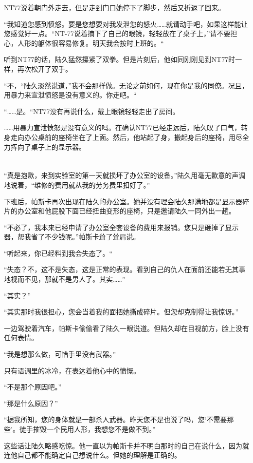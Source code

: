 NT77说着朝门外走去，但是走到门口她停下了脚步，然后又折返了回来。

“我知道您感到愤怒。要是您想要对我发泄您的怒火……就请动手吧，如果这样能让您感觉好一点。“NT-77说着摘下了自己的眼镜，轻轻放在了桌子上，”请不要担心，人形的躯体很容易修复。明天我会按时上班的。“

听到NT77的话，陆久猛然攥紧了双拳。但是片刻后，他如同刚刚见到NT77时一样，再次松开了双手。

“不，“陆久淡然说道，”我不会那样做。无论之前如何，现在你是我的同僚。况且，用暴力来宣泄愤怒是没有意义的。你走吧。“

“……是。“NT77没有再说什么，戴上眼镜轻轻走出了房间。

……用暴力宣泄愤怒是没有意义的吗。在确认NT77已经走远后，陆久叹了口气，转身走向办公桌前的座椅坐在了上面。然后，他站起了身，搬起身后的座椅，用尽全力挥向了桌子上的显示器。

\section*{}

“真是抱歉，来到实验室的第一天就损坏了办公室的设备。”陆久用毫无歉意的声调地说着，“维修的费用就从我的劳务费里扣好了。”

下班后，帕斯卡再次出现在陆久的办公室。她并没有理会陆久那满地都是显示器碎片的办公室和他屁股下面已经扭曲变形的座椅，只是邀请陆久一同外出一趟。

“不必了，我本来已经申请了办公室全套设备的费用来报销。您只是砸掉了显示器，帮我省了不少钱呢。”帕斯卡耸了耸肩说。

“听起来，你已经料到我会失态了。“

“失态？不，这不是失态，这是正常的表现。看到自己的仇人在面前还能若无其事地视而不见，那就不是男人了。其实……”

“其实？”

“其实那时我很担心，您会当着我的面把她撕成碎片。但您却克制得让我惊讶。”

一边驾驶着汽车，帕斯卡偷偷看了陆久一眼说道。但陆久却在目视前方，脸上没有任何表情。

“我是想那么做，可惜手里没有武器。” 

只有语调里的冰冷，在表达着他心中的愤慨。

“不是那个原因吧。”

“那是什么原因？”

“据我所知，您的身体就是一部杀人武器。昨天您不是也说了吗，您‘不需要那些’。徒手摧毁一个民用人形，我想您不是做不到。”

这些话让陆久略感吃惊。他一直以为帕斯卡并不明白那时的自己在说什么，因为就连他自己都不能确定自己想说什么。但她的理解是正确的。


